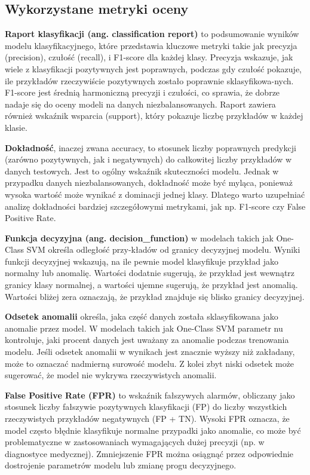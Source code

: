 \documentclass[a4paper,fleqn]{cas-dc}
\begin{document}
\subsection{Wykorzystane metryki oceny}


\textbf{Raport klasyfikacji (ang. classification report)} to podsumowanie wyników modelu klasyfikacyjnego, które przedstawia kluczowe metryki takie jak precyzja (precision), czułość (recall), i F1-score dla każdej klasy. Precyzja wskazuje, jak wiele z klasyfikacji pozytywnych jest poprawnych, podczas gdy czułość pokazuje, ile przykładów rzeczywiście pozytywnych zostało poprawnie sklasyfikowa-nych. F1-score jest średnią harmoniczną precyzji i czułości, co sprawia, że dobrze nadaje się do oceny modeli na danych niezbalansowanych. Raport zawiera również wskaźnik wsparcia (support), który pokazuje liczbę przykładów w każdej klasie.

\textbf{Dokładność}, inaczej zwana accuracy, to stosunek liczby poprawnych predykcji (zarówno pozytywnych, jak i negatywnych) do całkowitej liczby przykładów w danych testowych. Jest to ogólny wskaźnik skuteczności modelu. Jednak w przypadku danych niezbalansowanych, dokładność może być myląca, ponieważ wysoka wartość może wynikać z dominacji jednej klasy. Dlatego warto uzupełniać analizę dokładności bardziej szczegółowymi metrykami, jak np. F1-score czy False Positive Rate.

\textbf{Funkcja decyzyjna (ang. decision\_function)} w modelach takich jak One-Class SVM określa odległość przy-kładów od granicy decyzyjnej modelu. Wyniki funkcji decyzyjnej wskazują, na ile pewnie model klasyfikuje przykład jako normalny lub anomalię. Wartości dodatnie sugerują, że przykład jest wewnątrz granicy klasy normalnej, a wartości ujemne sugerują, że przykład jest anomalią. Wartości bliżej zera oznaczają, że przykład znajduje się blisko granicy decyzyjnej.

\textbf{Odsetek anomalii} określa, jaka część danych została sklasyfikowana jako anomalie przez model. W modelach takich jak One-Class SVM parametr nu kontroluje, jaki procent danych jest uważany za anomalie podczas trenowania modelu. Jeśli odsetek anomalii w wynikach jest znacznie wyższy niż zakładany, może to oznaczać nadmierną surowość modelu. Z kolei zbyt niski odsetek może sugerować, że model nie wykrywa rzeczywistych anomalii.

\textbf{False Positive Rate (FPR)} to wskaźnik fałszywych alarmów, obliczany jako stosunek liczby fałszywie pozytywnych klasyfikacji (FP) do liczby wszystkich rzeczywistych przykładów negatywnych (FP + TN). Wysoki FPR oznacza, że model często błędnie klasyfikuje normalne przypadki jako anomalie, co może być problematyczne w zastosowaniach wymagających dużej precyzji (np. w diagnostyce medycznej). Zmniejszenie FPR można osiągnąć przez odpowiednie dostrojenie parametrów modelu lub zmianę progu decyzyjnego.
\end{document}
